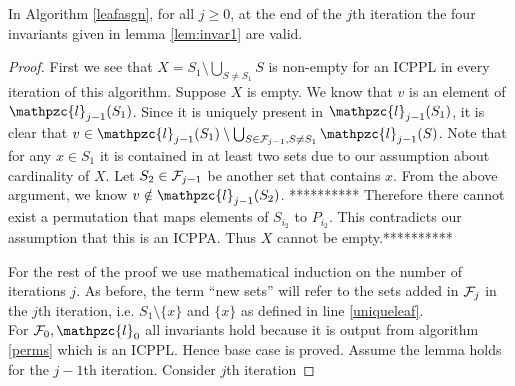 \documentclass{llncs}
\def\cF{{\cal F}}
\def\cl{\mathpzc{l}}
\begin{document}
\begin{lemma}
\label{lem:invar3}
In Algorithm \ref{leafasgn}, for all $j \geq 0$, at the end of the
$j$th iteration the four invariants given in lemma \ref{lem:invar1}
are valid.  
\end{lemma}
\begin{proof}
  First we see that $X = S_1 \setminus \bigcup_{S \ne S_1}S$ is
  non-empty for an ICPPL in every iteration of this algorithm. Suppose
  $X$ is empty. We know that $v$ is an element of
  $\cl_{j-1}(S_1)$. Since it is uniquely present in $\cl_{j-1}(S_1)$,
  it is clear that $v \in \cl_{j-1}(S_1) \setminus \bigcup_{S \in
    \cF_{j-1}, S \ne S_1}\cl_{j-1}(S)$.  Note that for any $x \in S_1$
  it is contained in at least two sets due to our assumption about
  cardinality of $X$. Let $S_2 \in \cF_{j-1}$ be another set that
  contains $x$. From the above argument, we know $v \notin
  \cl_{j-1}(S_2)$. ********** Therefore there cannot exist a
  permutation that maps elements of $S_{i_2}$ to $P_{i_2}$. This
  contradicts our assumption that this is an ICPPA. Thus $X$ cannot be
  empty.**********

  \noindent
  For the rest of the proof we use mathematical induction on the
  number of iterations $j$. As before, the term ``new sets'' will
  refer to the sets added in $\cF_j$ in the $j$th iteration, i.e. $S_1
  \setminus \{x\}$ and $\{x\}$ as defined in line \ref{uniqueleaf}.\\
  For $\cF_0, \cl_0$ all invariants hold because it is output from
  algorithm \ref{perms} which is an ICPPL. Hence base case is proved.
  Assume the lemma holds for the $j-1$th iteration. Consider $j$th
  iteration 


\end{proof}
\end{document}

